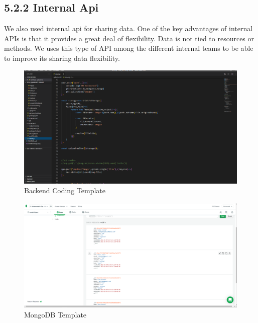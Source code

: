 \documentclass{standalone}
\begin{document}
\subsection*{5.2.2\hspace{0.3 cm} Internal Api}
 \vspace{0.8cm}

\hspace{0.5cm} We also used internal api for sharing data. One of the key advantages of internal APIs is that it provides a great deal of flexibility. Data is not tied to resources or methods. We uses this type of API among the different internal teams to be able to improve its sharing data flexibility.

\newpage
\vfill
\begin{figure}
\includegraphics[scale=0.3]{./img/img5.png} 
\caption{Backend Coding Template}
 \label{fig:backend}
\end{figure}

\begin{figure}
\includegraphics[scale=0.3]{./img/img4.png} 
\caption{MongoDB Template}
 \label{fig:DB}
\end{figure}
\end{document}
